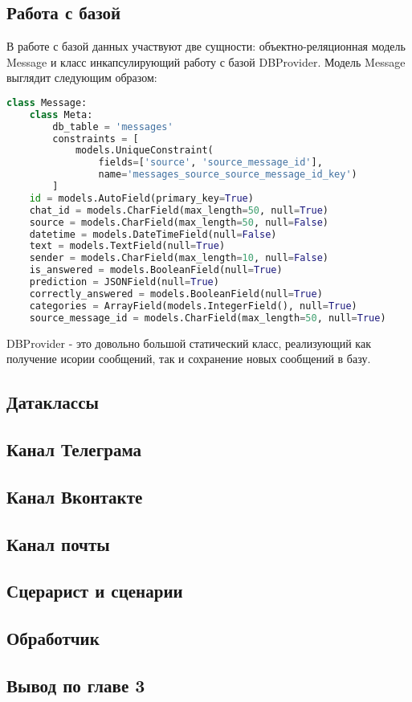     \subsection{Работа с базой}
    В работе с базой данных участвуют две сущности: объектно-реляционная модель Message
    и класс инкапсулирующий работу с базой DBProvider.
    Модель Message выглядит следующим образом:
\begin{lstlisting}[language=Python]
class Message:
    class Meta:
        db_table = 'messages'
        constraints = [
            models.UniqueConstraint(
                fields=['source', 'source_message_id'],
                name='messages_source_source_message_id_key')
        ]
    id = models.AutoField(primary_key=True)
    chat_id = models.CharField(max_length=50, null=True)
    source = models.CharField(max_length=50, null=False)
    datetime = models.DateTimeField(null=False)
    text = models.TextField(null=True)
    sender = models.CharField(max_length=10, null=False)
    is_answered = models.BooleanField(null=True)
    prediction = JSONField(null=True)
    correctly_answered = models.BooleanField(null=True)
    categories = ArrayField(models.IntegerField(), null=True)
    source_message_id = models.CharField(max_length=50, null=True)
\end{lstlisting}

    DBProvider - это довольно большой статический класс, реализующий как получение исории сообщений,
    так и сохранение новых сообщений в базу.

    \subsection{Датаклассы}
    \subsection{Канал Телеграма}
    \subsection{Канал Вконтакте}
    \subsection{Канал почты}
    \subsection{Сцерарист и сценарии}
    \subsection{Обработчик}
    \subsection*{Вывод по главе 3}
